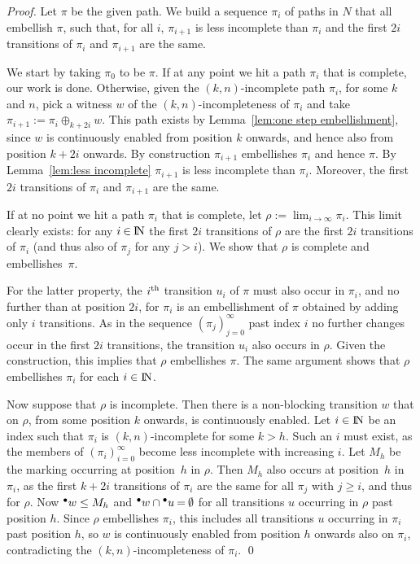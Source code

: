 \documentclass[smallcondensed]{svjour3}
\newcommand{\Lem}[1]{Lemma~\ref{lem:#1}}
\begin{document}
\begin{proof}
Let $\pi$ be the given path.
We build a sequence $\pi_i$ of paths in $N$ that all embellish $\pi$, such that, for all $i$,
$\pi_{i+1}$ is less incomplete than $\pi_i$ and the first $2i$ transitions of $\pi_i$ and $\pi_{i+\!1}$ are the same.

We start by taking $\pi_0$ to be $\pi$.
If at any point we hit a path $\pi_i$ that is complete, our work is done.
Otherwise, given the $(k,n)$-incomplete path $\pi_i$, for some $k$ and $n$,
pick a witness $w$ of the $(k,n)$-incompleteness of $\pi_i$ and take $\pi_{i+1} \mathbin{:=} \pi_i\oplus_{k+2i}w$.
This path exists by \Lem{one step embellishment}, since $w$ is continuously enabled from position
$k$ onwards, and hence also from position $k+2i$ onwards.
By construction $\pi_{i+1}$ embellishes $\pi_i$ and hence $\pi$.
By \Lem{less incomplete} $\pi_{i+1}$ is less incomplete than $\pi_i$.
Moreover, the first $2i$ transitions of $\pi_i$ and $\pi_{i+\!1}$ are the same.

If at no point we hit a path $\pi_i$ that is complete, let $\rho:=\lim_{i\rightarrow\infty}\pi_i$.
This limit clearly exists: for any $i\mathbin\in\mathop{\rm I\mkern-2.5mu N}\nolimits $ the first $2i$ transitions of $\rho$ are the first
$2i$ transitions of $\pi_i$ (and thus also of $\pi_j$ for any $j\mathbin>i$).
We show that $\rho$ is complete and embellishes~$\pi$.

For the latter property, the $i^{\rm th}$ transition $u_i$ of $\pi$ must also occur in $\pi_i$, and
no further than at position $2i$, for $\pi_i$ is an embellishment of $\pi$ obtained by adding only
$i$ transitions. As in the sequence $(\pi_j)_{j=0}^\infty$ past index $i$ no further changes occur
in the first $2i$ transitions, the transition $u_i$ also occurs in $\rho$.
Given the construction, this implies that $\rho$ embellishes $\pi$.
The same argument shows that $\rho$ embellishes $\pi_i$ for each $i\in\mathop{\rm I\mkern-2.5mu N}\nolimits $.

Now suppose that $\rho$ is incomplete. Then there is a non-blocking transition $w$
that on $\rho$, from some position $k$ onwards, is continuously enabled.
Let $i\in\mathop{\rm I\mkern-2.5mu N}\nolimits $ be an index such that $\pi_i$ is $(k,n)$-incomplete for some $k>h$.
Such an $i$ must exist, as the members of $(\pi_i)_{i=0}^\infty$ become less incomplete with
increasing $i$.
Let $M_h$ be the marking occurring at position~$h$ in $\rho$.
Then $M_h$ also occurs at position~$h$ in $\pi_i$, as the first $k+2i$ transitions of $\pi_i$
are the same for all $\pi_j$ with $j\geq i$, and thus for $\rho$.
Now $\precond{w}\leq M_h$ and \mbox{$\precond{w}\cap\precond{u}\mathbin=\emptyset$} for all transitions
$u$ occurring in $\rho$ past position $h$. Since $\rho$ embellishes $\pi_i$, this includes all transitions $u$ occurring
in $\pi_i$ past position $h$, so $w$ is continuously enabled from position $h$ onwards also on $\pi_i$,
contradicting the $(k,n)$-incompleteness of $\pi_i$.
\qed
\end{proof}
\end{document}
